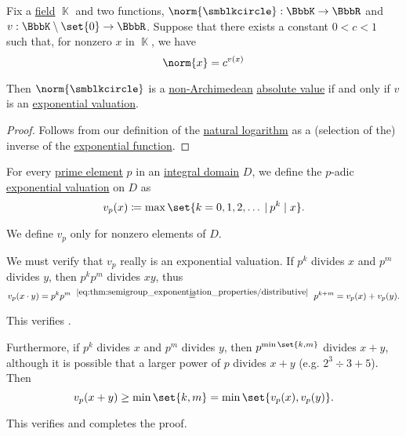 \begin{proposition}\label{thm:exponential_and_additive_valuations}
  Fix a \hyperref[def:field]{field} \( \BbbK \) and two functions, \( \norm{\anon}: \BbbK \to \BbbR \) and \( v: \BbbK \setminus \set{ 0 } \to \BbbR \). Suppose that there exists a constant \( 0 < c < 1 \) such that, for nonzero \( x \) in \( \BbbK \), we have
  \begin{equation}\label{eq:thm:exponential_and_additive_valuations}
    \norm{x} = c^{v(x)}
  \end{equation}

  Then \( \norm{\anon} \) is a \hyperref[def:non_archimedean_absolute_value]{non-Archimedean} \hyperref[def:absolute_value]{absolute value} if and only if \( v \) is an \hyperref[def:exponential_valuation]{exponential valuation}.
\end{proposition}
\begin{proof}
  Follows from our definition of the \hyperref[def:logarithm]{natural logarithm} as a (selection of the) inverse of the \hyperref[def:exponential_function]{exponential function}.
\end{proof}

\begin{definition}\label{def:padic_valuation}
  For every \hyperref[def:domain_divisibility/prime]{prime element} \( p \) in an \hyperref[def:integral_domain]{integral domain} \( D \), we define the \( p \)-adic \hyperref[def:exponential_valuation]{exponential valuation} on \( D \) as
  \begin{equation}\label{eq:def:padic_valuation}
    v_p(x) \coloneqq \max\set{ k = 0, 1, 2, \ldots \given p^k \mid x }.
  \end{equation}
\end{definition}
\begin{comments}
  \item We define \( v_p \) only for nonzero elements of \( D \).
\end{comments}
\begin{defproof}
  We must verify that \( v_p \) really is an exponential valuation. If \( p^k \) divides \( x \) and \( p^m \) divides \( y \), then \( p^k p^m \) divides \( xy \), thus
  \begin{equation*}
    v_p(x \cdot y)
    =
    p^k p^m
    \reloset {\eqref{eq:thm:semigroup_exponentiation_properties/distributive}} =
    p^{k + m}
    =
    v_p(x) + v_p(y).
  \end{equation*}

  This verifies .

  Furthermore, if \( p^k \) divides \( x \) and \( p^m \) divides \( y \), then \( p^{\min\set{ k, m }} \) divides \( x + y \), although it is possible that a larger power of \( p \) divides \( x + y \) (e.g. \( 2^3 \div 3 + 5 \)). Then
  \begin{equation*}
    v_p(x + y)
    \geq
    \min\set{ k, m }
    =
    \min\set{ v_p(x), v_p(y) }.
  \end{equation*}

  This verifies  and completes the proof.
\end{defproof}

